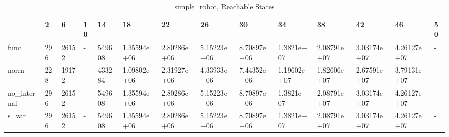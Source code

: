 \begin{table}
\caption{simple_robot, Reachable States}
\label{simple_robot_reach}
\begin{tabular}{llllllllllllll}
\toprule
 & 2 & 6 & 10 & 14 & 18 & 22 & 26 & 30 & 34 & 38 & 42 & 46 & 50 \\
\midrule
func & 296 & 26152 & - & 549608 & 1.35594e+06 & 2.80286e+06 & 5.15223e+06 & 8.70897e+06 & 1.3821e+07 & 2.08791e+07 & 3.03174e+07 & 4.26127e+07 & - \\
norm & 228 & 19172 & - & 433284 & 1.09802e+06 & 2.31927e+06 & 4.33933e+06 & 7.44352e+06 & 1.19602e+07 & 1.82606e+07 & 2.67591e+07 & 3.79131e+07 & - \\
no_internal & 296 & 26152 & - & 549608 & 1.35594e+06 & 2.80286e+06 & 5.15223e+06 & 8.70897e+06 & 1.3821e+07 & 2.08791e+07 & 3.03174e+07 & 4.26127e+07 & - \\
s_var & 296 & 26152 & - & 549608 & 1.35594e+06 & 2.80286e+06 & 5.15223e+06 & 8.70897e+06 & 1.3821e+07 & 2.08791e+07 & 3.03174e+07 & 4.26127e+07 & - \\
\bottomrule
\end{tabular}
\end{table}
